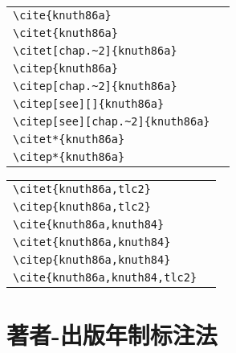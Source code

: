\noindent
\begin{tabular}{l@{\quad$\Rightarrow$\quad}l}
  \verb|\cite{knuth86a}| & \cite{knuth86a}\\
  \verb|\citet{knuth86a}| & \citet{knuth86a}\\
  \verb|\citet[chap.~2]{knuth86a}| & \citet[chap.~2]{knuth86a}\\[0.5ex]
  \verb|\citep{knuth86a}| & \citep{knuth86a}\\
  \verb|\citep[chap.~2]{knuth86a}| & \citep[chap.~2]{knuth86a}\\
  \verb|\citep[see][]{knuth86a}| & \citep[see][]{knuth86a}\\
  \verb|\citep[see][chap.~2]{knuth86a}| & \citep[see][chap.~2]{knuth86a}\\[0.5ex]
  \verb|\citet*{knuth86a}| & \citet*{knuth86a}\\
  \verb|\citep*{knuth86a}| & \citep*{knuth86a}\\
\end{tabular}
\par\noindent
\begin{tabular}{l@{\quad$\Rightarrow$\quad}l}
  \verb|\citet{knuth86a,tlc2}| & \citet{knuth86a,tlc2}\\
  \verb|\citep{knuth86a,tlc2}| & \citep{knuth86a,tlc2}\\
  \verb|\cite{knuth86a,knuth84}| & \cite{knuth86a,knuth84}\\
  \verb|\citet{knuth86a,knuth84}| & \citet{knuth86a,knuth84}\\
  \verb|\citep{knuth86a,knuth84}| & \citep{knuth86a,knuth84}\\
  \verb|\cite{knuth86a,knuth84,tlc2}| & \cite{knuth86a,knuth84,tlc2}\\
\end{tabular}



\section{著者-出版年制标注法}

